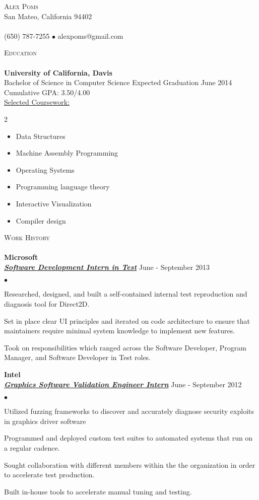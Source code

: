 \documentclass{article}
\newcommand{\lineunder}{\vspace*{-8pt} \\ \hspace*{-18pt} \hrulefill \\}
\newcommand{\header}[1]{{\hspace*{-15pt}\vspace*{6pt} \textsc{#1}} \vspace*{-6pt} \lineunder}
\newcommand{\employer}[3]{{ \textbf{#1} \\ \underline{\textbf{\emph{#3}}} \hfill #2\\  }}
\newcommand{\contact}[3]{
\vspace*{-8pt}
\begin{center}
{\LARGE \scshape {#1}}\\
#2 \lineunder 
#3
\end{center}
\vspace*{-8pt}
}
\newenvironment{achievements}{\begin{list}{$\bullet$}{\topsep 0pt \itemsep -2pt}}{\vspace*{4pt}\end{list}}
\newcommand{\schoolwithcourses}[4]{
\textbf{#1} \\
#2 \hfill #3 \\
#4\\ 
\underline{Selected Coursework:}\\

}
\begin{document}
\small
\smallskip
\vspace*{-44pt}

\contact{Alex Poms}
{San Mateo, California 94402}
{(650) 787-7255 $\bullet$ alexpoms@gmail.com}

\begin{center}

\end{center}

\header{Education}

\schoolwithcourses{University of California, Davis}{Bachelor of
  Science in Computer Science}{Expected Graduation June 2014}
{Cumulative GPA: 3.50/4.00}
\vspace*{-8pt}
\begin{multicols}{2}
\begin{itemize} \itemsep0em
\item Data Structures
\item Machine Assembly Programming
\item Operating Systems
\item Programming language theory
\item Interactive Visualization
\item Compiler design
\end{itemize}
\end{multicols}

\header{Work History}
\employer{Microsoft}{June - September 2013}{Software Development
  Intern in Test}
\begin{achievements}
\item Researched, designed, and built a self-contained internal test
  reproduction and diagnosis tool for Direct2D.
\item Set in place clear UI principles and iterated on code
  architecture to ensure that maintainers require minimal system
  knowledge to implement new features.
\item Took on responsibilities which ranged across the Software
  Developer, Program Manager, and Software Developer in Test roles.
\end{achievements}

\employer{Intel}{June - September 2012}{Graphics Software Validation
  Engineer Intern}
\begin{achievements}
\item Utilized fuzzing frameworks to discover and accurately diagnose
  security exploits in graphics driver software
\item Programmed and deployed custom test suites to automated systems that run on a regular cadence.
\item Sought collaboration with different members within the the
  organization in order to accelerate test production.
\item Built in-house tools to accelerate manual tuning and testing.
\end{achievements}
\end{document}
